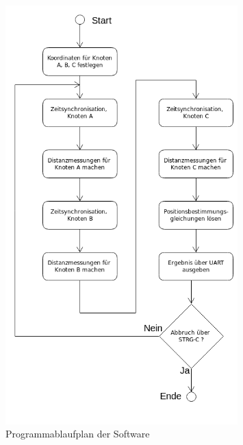 \begin{figure}[H]
        \centering
        \includegraphics[width=0.8\textwidth]{images/PAP.png}
        \caption{Programmablaufplan der Software}
        \label{img:PAP}
\end{figure}


























